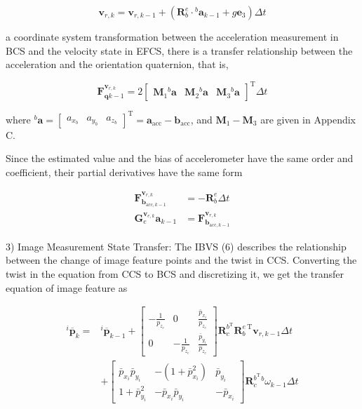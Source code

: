 $$
\mathbf{v}_{r, k}=\mathbf{v}_{r, k-1}+\left(\mathbf{R}_b^e \cdot{ }^b \mathbf{a}_{k-1}+g \mathbf{e}_3\right) \Delta t
$$

a coordinate system transformation between the acceleration measurement in BCS and the velocity state in EFCS, there is a transfer relationship between the acceleration and the orientation quaternion, that is,

$$
\mathbf{F}_{\mathbf{q} k-1}^{\mathbf{v}_{r, k}}=2\left[\begin{array}{lll}
\mathbf{M}_1{ }^b \mathbf{a} & \mathbf{M}_2{ }^b \mathbf{a} & \mathbf{M}_3{ }^b \mathbf{a}
\end{array}\right]^{\mathrm{T}} \Delta t
$$

where ${ }^b \mathbf{a}=\left[\begin{array}{lll}a_{x_b} & a_{y_b} & a_{z_b}\end{array}\right]^{\mathrm{T}}=\mathbf{a}_{\mathrm{acc}}-\mathbf{b}_{\mathrm{acc}}$, and $\mathbf{M}_1-\mathbf{M}_3$ are given in Appendix C.

Since the estimated value and the bias of accelerometer have the same order and coefficient, their partial derivatives have the same form

$$
\begin{aligned}
\mathbf{F}_{\mathbf{b}_{\mathrm{acc}, k-1}}^{\mathbf{v}_{r, k}} & =-\mathbf{R}_b^e \Delta t \\
\mathbf{G}_e^{\mathbf{v}_{e, k}} \mathbf{a}_{k-1} & =\mathbf{F}_{\mathbf{b}_{\mathrm{acc}, k-1}}^{\mathbf{v}_{r, k}}
\end{aligned}
$$

3) Image Measurement State Transfer: The IBVS (6) describes the relationship between the change of image feature points and the twist in CCS. Converting the twist in the equation from CCS to BCS and discretizing it, we get the transfer equation of image feature as

$$
\begin{aligned}
{ }^i \overline{\mathbf{p}}_k= & { }^i \overline{\mathbf{p}}_{k-1}+\left[\begin{array}{ccc}
-\frac{1}{p_{z_c}} & 0 & \frac{\bar{p}_{x_i}}{p_{z_c}} \\
0 & -\frac{1}{p_{z_c}} & \frac{\bar{p}_{y_i}}{p_{z_c}}
\end{array}\right] \mathbf{R}_c^{b^{\mathrm{T}}} \mathbf{R}_b^{e \mathrm{~T}} \mathbf{v}_{r, k-1} \Delta t \\
& +\left[\begin{array}{ccc}
\bar{p}_{x_i} \bar{p}_{y_i} & -\left(1+\bar{p}_{x_i}^2\right) & \bar{p}_{y_i} \\
1+\bar{p}_{y_i}^2 & -\bar{p}_{x_i} \bar{p}_{y_i} & -\bar{p}_{x_i}
\end{array}\right] \mathbf{R}_c^{b^{\mathrm{T}}}{ }^b \omega_{k-1} \Delta t
\end{aligned}
$$


